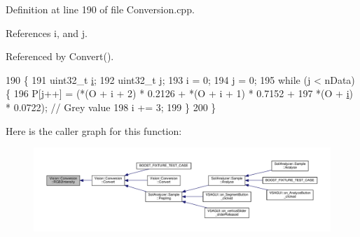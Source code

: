 Definition at line 190 of file Conversion.\+cpp.



References i, and j.



Referenced by Convert().


\begin{DoxyCode}
190                                                             \{
191   uint32\_t \hyperlink{_comparision_pictures_2_createtest_image_8m_a6f6ccfcf58b31cb6412107d9d5281426}{i};
192   uint32\_t \hyperlink{_comparision_pictures_2_createtest_image_8m_ac86694252f8dfdb19aaeadc4b7c342c6}{j};
193   i = 0;
194   j = 0;
195   \textcolor{keywordflow}{while} (j < nData) \{
196     P[j++] = (*(O + i + 2) * 0.2126 + *(O + i + 1) * 0.7152 +
197               *(O + \hyperlink{_comparision_pictures_2_createtest_image_8m_a6f6ccfcf58b31cb6412107d9d5281426}{i}) * 0.0722); \textcolor{comment}{// Grey value}
198     i += 3;
199   \}
200 \}
\end{DoxyCode}


Here is the caller graph for this function\+:\nopagebreak
\begin{figure}[H]
\begin{center}
\leavevmode
\includegraphics[width=350pt]{class_vision_1_1_conversion_a93626e56872b99ed79fd3540c6adf776_icgraph}
\end{center}
\end{figure}


\hypertarget{class_vision_1_1_conversion_afe7b24da82f77ff1116f8bc3d0a62fcc}{}
